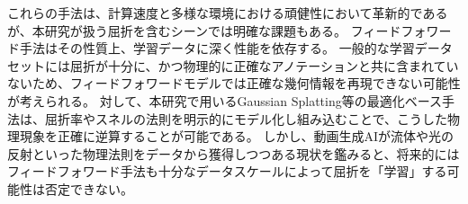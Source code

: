 これらの手法は、計算速度と多様な環境における頑健性において革新的であるが、本研究が扱う屈折を含むシーンでは明確な課題もある。
フィードフォワード手法はその性質上、学習データに深く性能を依存する。
一般的な学習データセットには屈折が十分に、かつ物理的に正確なアノテーションと共に含まれていないため、フィードフォワードモデルでは正確な幾何情報を再現できない可能性が考えられる。
対して、本研究で用いるGaussian Splatting等の最適化ベース手法は、屈折率やスネルの法則を明示的にモデル化し組み込むことで、こうした物理現象を正確に逆算することが可能である。
しかし、動画生成AIが流体や光の反射といった物理法則をデータから獲得しつつある現状を鑑みると\cite{Liu2024arXiv_Sora-review}、将来的にはフィードフォワード手法も十分なデータスケールによって屈折を「学習」する可能性は否定できない。

